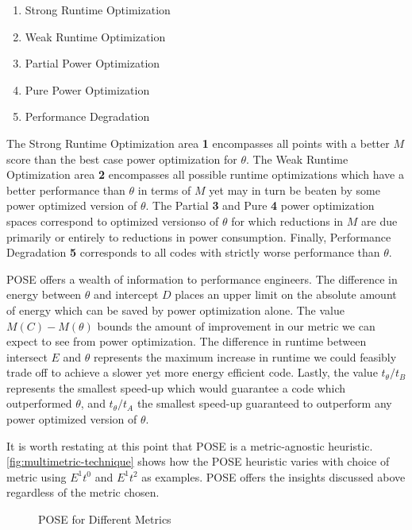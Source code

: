 \begin{enumerate}
\item Strong Runtime Optimization
\item Weak Runtime Optimization
\item Partial Power Optimization
\item Pure Power Optimization
\item Performance Degradation
\end{enumerate}

The Strong Runtime Optimization area \textbf{1} encompasses all points with a better $M$ score than the best case power optimization for $\theta$. The Weak Runtime Optimization area \textbf{2} encompasses all possible runtime optimizations which have a better performance than $\theta$ in terms of $M$ yet may in turn be beaten by some power optimized version of $\theta$. The Partial \textbf{3} and Pure \textbf{4} power optimization spaces correspond to optimized versionso of $\theta$ for which reductions in $M$ are due primarily or entirely to reductions in power consumption.
Finally, Performance Degradation \textbf{5} corresponds to all codes with strictly worse performance than $\theta$.


POSE offers a wealth of information to performance engineers.
The difference in energy between $\theta$ and intercept $D$ places an upper limit on the absolute amount of energy which can be saved by power optimization alone.
The value $M(C) - M(\theta)$ bounds the amount of improvement in our metric we can expect to see from power optimization.
The difference in runtime between intersect $E$ and $\theta$ represents the maximum increase in runtime we could feasibly trade off to achieve a slower yet more energy efficient code.
Lastly, the value $t_\theta / t_B$ represents the smallest speed-up which would guarantee a code which outperformed $\theta$, and $t_\theta / t_A$ the smallest speed-up guaranteed to outperform any power optimized version of $\theta$.

It is worth restating at this point that POSE is a metric-agnostic heuristic. \autoref{fig:multimetric-technique} shows how the POSE heuristic varies with choice of metric using $E^1t^0$ and $E^1t^2$ as examples. POSE offers the insights discussed above regardless of the metric chosen.

\begin{figure}
\centering

\caption{POSE for Different Metrics}
\label{fig:multimetric-technique}
\end{figure}
